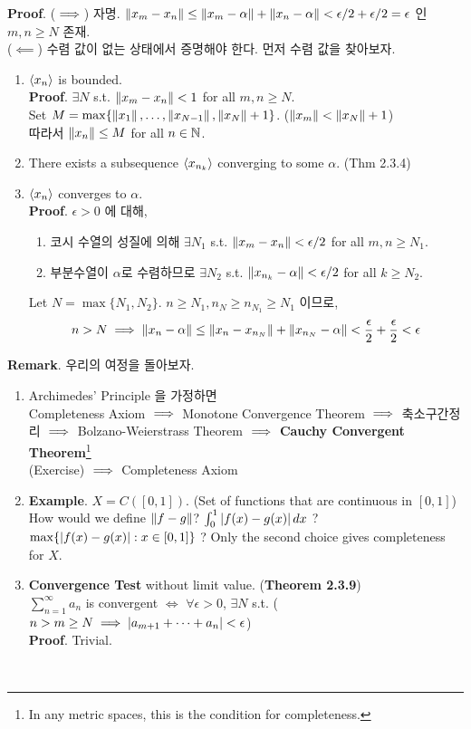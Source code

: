 \textbf{Proof}. ($\implies$) 자명. $\left\lVert x_m-x_n\right\rVert \leq \left\lVert x_m-\alpha\right\rVert + \left\lVert x_n-\alpha\right\rVert < \epsilon/2+\epsilon/2 = \epsilon$ 인 $m, n\geq N$ 존재.\\
($\impliedby$) 수렴 값이 없는 상태에서 증명해야 한다. 먼저 수렴 값을 찾아보자.
\begin{enumerate}
	\item $\left\langle x_n \right\rangle$ is bounded.\\
	\textbf{Proof}. $\exists N$ s.t. $\left\lVert x_m-x_n\right\rVert < 1$ for all $m, n\geq N$.\\
	Set $M = \max\{\left\lVert x_1\right\rVert, \dots, \left\lVert x_{N-1}\right\rVert, \left\lVert x_N\right\rVert+1 \}$. ($\left\lVert x_m\right\rVert < \left\lVert x_N\right\rVert+1$)\\
	따라서 $\left\lVert x_n\right\rVert\leq M$ for all $n\in\mathbb{N}$.
	\item There exists a subsequence $\left\langle x_{n_k} \right\rangle$ converging to some $\alpha$. (Thm 2.3.4)
	\item $\left\langle x_n \right\rangle$ converges to $\alpha$.\\
	\textbf{Proof}. $\epsilon>0$ 에 대해, 
	\begin{enumerate}
		\item 코시 수열의 성질에 의해 $\exists N_1$ s.t. $\left\lVert x_m-x_n\right\rVert<\epsilon/2$ for all $m, n\geq N_1$.
		\item 부분수열이 $\alpha$로 수렴하므로 $\exists N_2$ s.t. $\left\lVert x_{n_k} -\alpha\right\rVert < \epsilon/2$ for all $k\geq N_2$. 
	\end{enumerate}
	Let $N = \max\{N_1, N_2 \}$. $ n\geq N_1, n_N\geq n_{N_1} \geq N_1 $ 이므로,\\
	$$n>N \implies \left\lVert x_n - \alpha\right\rVert\leq \left\lVert x_n-x_{n_N}\right\rVert + \left\lVert x_{n_N} - \alpha\right\rVert < \frac{\epsilon}{2} + \frac{\epsilon}{2} < \epsilon$$
\end{enumerate}
\pagebreak
\textbf{Remark}. 우리의 여정을 돌아보자. 
\begin{enumerate}
	\item Archimedes' Principle 을 가정하면\\
	Completeness Axiom $\implies$ Monotone Convergence Theorem $\implies$ 축소구간정리 $\implies$ Bolzano-Weierstrass Theorem $\implies$ \textbf{Cauchy Convergent Theorem}\footnote{In any metric spaces, this is the condition for completeness.} \\
	(Exercise) $\implies$ Completeness Axiom
	\item \textbf{Example}. $X = C([0, 1])$. (Set of functions that are continuous in $[0, 1]$) How would we define $\left\lVert f-g\right\rVert$? $\int_0^1 \left|f(x)-g(x)\right|dx$ ? $\max\{\left|f(x)-g(x)\right|: x\in[0, 1]\}$ ? Only the second choice gives completeness for $X$.
	\item \textbf{Convergence Test} without limit value. (\textbf{Theorem 2.3.9}) \\
	$\sum_{n=1}^{\infty} a_n$ is convergent $\iff$ $\forall\epsilon > 0$, $\exists N$ s.t. ($n > m \geq N \implies \left|a_{m+1} + \cdots + a_n\right| < \epsilon$)\\
	\textbf{Proof}. Trivial.
\end{enumerate}~\\

